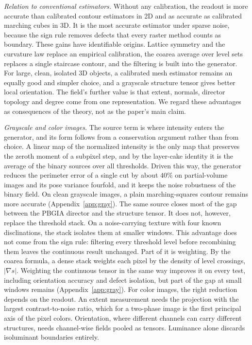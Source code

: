 \documentclass[11pt,a4paper]{article}
\begin{document}
\emph{Relation to conventional estimators.} Without any calibration, the readout is more accurate than calibrated contour estimators in 2D and as accurate as calibrated marching cubes in 3D. It is the most accurate estimator under sparse noise, because the sign rule removes defects that every raster method counts as boundary. These gains have identifiable origins. Lattice symmetry and the curvature law replace an empirical calibration, the coarea average over level sets replaces a single staircase contour, and the filtering is built into the generator. For large, clean, isolated 3D objects, a calibrated mesh estimator remains an equally good and simpler choice, and a grayscale structure tensor gives better local orientation. The field's further value is that extent, normals, director topology and degree come from one representation. We regard these advantages as consequences of the theory, not as the paper's main claim.

\emph{Grayscale and color images.} The source term is where intensity enters the generator, and its form follows from a conservation argument rather than from choice. A linear map of the normalized intensity is the only map that preserves the zeroth moment of a subpixel step, and by the layer-cake identity it is the average of the binary sources over all thresholds. Driven this way, the generator reduces the perimeter error of a single cut by about $40\%$ on partial-volume images and its pose variance fourfold, and it keeps the noise robustness of the binary field. On clean grayscale images, a plain marching-squares contour remains more accurate (Appendix~\ref{app:gray}). The same source closes most of the gap between the PBGIA director and the structure tensor. It does not, however, replace the threshold stack. On a noise-carrying texture with four known disclinations, the stack isolates them at smaller windows. This advantage does not come from the sign rule: filtering every threshold level before recombining them leaves the continuous result unchanged. Part of it is weighting. By the coarea formula, a dense stack weights each pixel by the density of level crossings, $|\nabla s|$. Weighting the continuous tensor in the same way improves it on every test, including orientation accuracy and defect isolation, but part of the gap at small windows remains (Appendix~\ref{app:gray}). For color images, the right reduction depends on the readout. An extent measurement needs the projection with the largest contrast-to-noise ratio, which for a two-phase image is the first principal axis of the pixel colors. Orientation, where different channels can carry different structures, needs channel-wise fields pooled as tensors. Luminance alone discards isoluminant boundaries entirely.
\end{document}

